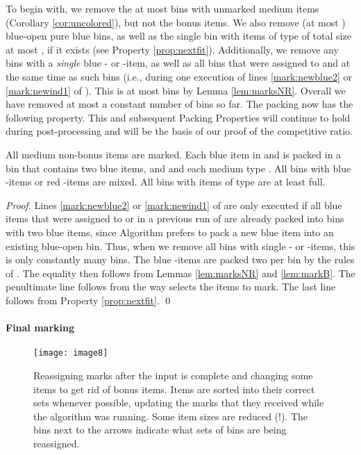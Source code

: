 To begin with, we remove the at most  bins with unmarked medium items
(Corollary \ref{cor:uncolored}), but not the bonus items.
We also remove (at most ) blue-open pure blue bins,
as well as the single bin with items of type  of total size at most , if it exists (see Property \ref{prop:nextfit}).
Additionally, we remove any bins with a \emph{single} blue - or -item, as well as all bins that were assigned to  and  at the same
time as such bins (i.e., during one execution of lines \ref{mark:newblue2} or \ref{mark:newind1} of {\MarkItems}).
This is at most  bins
by Lemma \ref{lem:marksNR}.
Overall we have removed at most a constant number of bins so far.
The packing now has the following property.
This and subsequent Packing Properties will continue to hold during post-processing and will be the basis of our proof of the competitive ratio.

\begin{pproperty}
\label{pp:twoblue}
All medium non-bonus items are marked.
Each blue item in  and  is packed in a bin that contains two blue items,
and  and 
each medium type .
All bins with blue -items or red -items are mixed. 
All bins with items of type  are at least  full.
\end{pproperty}
\begin{proof}
Lines \ref{mark:newblue2} or \ref{mark:newind1} of {\MarkItems} are only executed if all blue items that were
assigned to  or  in a previous run of {\MarkItems}
are already packed into bins with two blue items, since 
Algorithm {\Pack} prefers to pack a new blue item into an existing blue-open bin.
Thus, when we remove all bins with single - or -items, this is only constantly many bins.
The blue -items are packed two per bin by the rules of \MarkItems.
The equality then follows from Lemmas \ref{lem:marksNR} and \ref{lem:markB}. 
The penultimate line follows from the way {\MarkItems} selects the items to mark. The last line follows from Property \ref{prop:nextfit}.
\qed\end{proof}


\paragraph{Final marking}
\label{sec:final}

\begin{figure}[t!]
	\begin{center}
		\texttt{[image: image8]}
		\caption{\label{fig:final}Reassigning marks after the input is complete and changing some items to get rid of bonus items.
		Items are sorted into their correct sets whenever possible, updating the marks
		that they received while the algorithm was running. Some item sizes are reduced (!).
		The bins next to the arrows indicate what sets of bins are being reassigned.
		}
	\end{center}
\end{figure}


